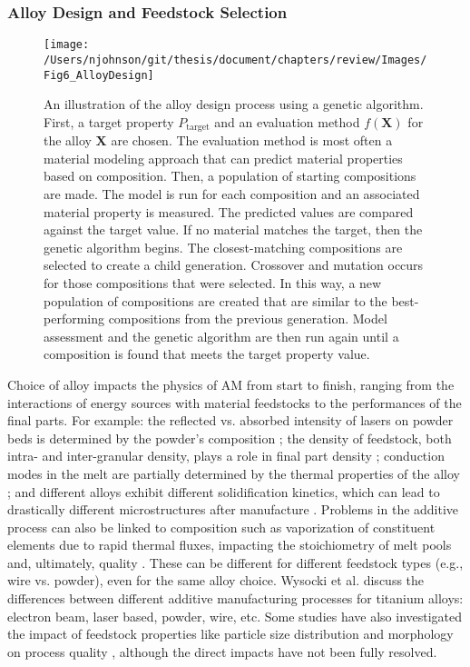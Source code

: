 \subsubsection{Alloy Design and Feedstock Selection}
\begin{figure*}
	\texttt{[image: /Users/njohnson/git/thesis/document/chapters/review/Images/Fig6\_AlloyDesign]}
	\caption{An illustration of the alloy design process using a genetic algorithm. First, a target property $P_\text{target}$ and an evaluation method $f(\mathbf{X})$ for the alloy $\mathbf{X}$ are chosen. The evaluation method is most often a material modeling approach that can predict material properties based on composition. Then, a population of starting compositions are made. The model is run for each composition and an associated material property is measured. The predicted values are compared against the target value. If no material matches the target, then the genetic algorithm begins. The closest-matching compositions are selected to create a child generation. Crossover and mutation occurs for those compositions that were selected. In this way, a new population of compositions are created that are similar to the best-performing compositions from the previous generation. Model assessment and the genetic algorithm are then run again until a composition is found that meets the target property value.}
	\label{fig:GA}
\end{figure*}
Choice of alloy impacts the physics of AM from start to finish, ranging from the interactions of energy sources with material feedstocks to the performances of the final parts. For example: the reflected vs. absorbed intensity of lasers on powder beds is determined by the powder's composition \cite{Boley2016, Trapp2017}; the density of feedstock, both intra- and inter-granular density, plays a role in final part density \cite{Bi2013}; conduction modes in the melt are partially determined by the thermal properties of the alloy \cite{Martin2017}; and different alloys exhibit different solidification kinetics, which can lead to drastically different microstructures after manufacture \cite{Collins2016}. Problems in the additive process can also be linked to composition such as vaporization of constituent elements due to rapid thermal fluxes, impacting the stoichiometry of melt pools and, ultimately, quality \cite{Brice2018}. These can be different for different feedstock types (e.g., wire vs. powder), even for the same alloy choice. Wysocki et al. discuss the differences between different additive manufacturing processes for titanium alloys: electron beam, laser based, powder, wire, etc\cite{Wysocki2017}. Some studies have also investigated the impact of feedstock properties like particle size distribution and morphology on process quality \cite{Slotwinski2014, Strondl2015, Trapp2017}, although the direct impacts have not been fully resolved.


